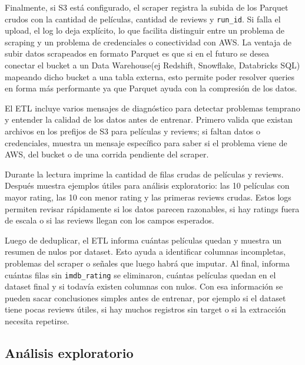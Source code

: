 \documentclass[letterpaper,12pt]{article}
\begin{document}
Finalmente, si S3 está configurado, el scraper registra la subida de los Parquet crudos con la cantidad de películas, cantidad de reviews y \texttt{run\_id}. Si falla el upload, el log lo deja explícito, lo que facilita distinguir entre un problema de scraping y un problema de credenciales o conectividad con AWS.
La ventaja de subir datos scrapeados en formato Parquet es que si en el futuro se desea conectar el bucket a un Data Warehouse(ej Redshift, Snowflake, Databricks SQL) mapeando dicho bucket a una tabla externa, esto permite poder resolver queries en forma más performante ya que Parquet ayuda con la compresión de los datos.

El ETL incluye varios mensajes de diagnóstico para detectar problemas temprano y entender la calidad de los datos antes de entrenar. Primero valida que existan archivos en los prefijos de S3 para películas y reviews; si faltan datos o credenciales, muestra un mensaje específico para saber si el problema viene de AWS, del bucket o de una corrida pendiente del scraper.

Durante la lectura imprime la cantidad de filas crudas de películas y reviews. Después muestra ejemplos útiles para análisis exploratorio: las 10 películas con mayor rating, las 10 con menor rating y las primeras reviews crudas. Estos logs permiten revisar rápidamente si los datos parecen razonables, si hay ratings fuera de escala o si las reviews llegan con los campos esperados.

Luego de deduplicar, el ETL informa cuántas películas quedan y muestra un resumen de nulos por dataset. Esto ayuda a identificar columnas incompletas, problemas del scraper o señales que luego habrá que imputar. Al final, informa cuántas filas sin \texttt{imdb\_rating} se eliminaron, cuántas películas quedan en el dataset final y si todavía existen columnas con nulos. Con esa información se pueden sacar conclusiones simples antes de entrenar, por ejemplo si el dataset tiene pocas reviews útiles, si hay muchos registros sin target o si la extracción necesita repetirse.

\subsection{Análisis exploratorio}
\label{sec:eda}
\end{document}
